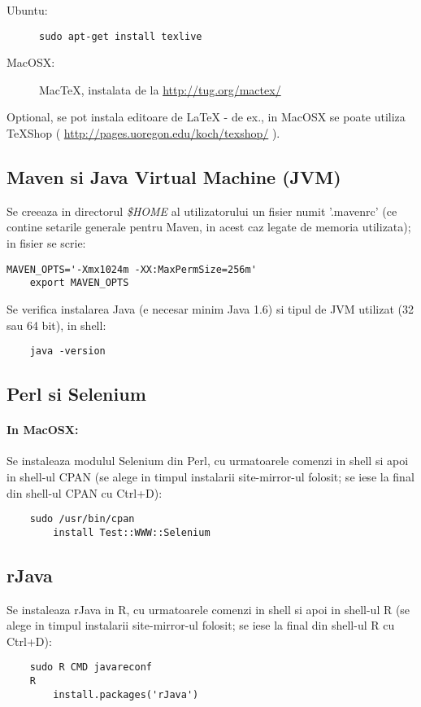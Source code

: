 \begin{description}
\item[Ubuntu:] 
\begin{lstlisting}[breaklines=true]
	sudo apt-get install texlive
\end{lstlisting}
\item[MacOSX:] 
MacTeX, instalata de la \url{http://tug.org/mactex/} 
\end{description}

Optional, se pot instala editoare de LaTeX - de ex., 
in MacOSX  se poate utiliza TeXShop 
( \url{http://pages.uoregon.edu/koch/texshop/} ).

\subsection{Maven si Java Virtual Machine (JVM)}
Se creeaza in directorul \emph{\$HOME} al utilizatorului un fisier numit
'.mavenrc' 
(ce contine setarile generale pentru Maven, in acest caz legate de memoria utilizata);
in fisier se scrie:
\begin{lstlisting}[breaklines=true]
	MAVEN_OPTS='-Xmx1024m -XX:MaxPermSize=256m'
	export MAVEN_OPTS
\end{lstlisting}

\label{java_version}
Se verifica instalarea Java (e necesar minim Java 1.6) si tipul de JVM
utilizat (32 sau 64 bit), in shell:
\begin{lstlisting}
	java -version
\end{lstlisting}

\subsection{Perl si Selenium}
\paragraph{In MacOSX:}
Se instaleaza modulul Selenium din Perl, cu urmatoarele comenzi in shell si apoi in shell-ul CPAN
(se alege in timpul instalarii site-mirror-ul folosit;
se iese la final din shell-ul CPAN cu Ctrl+D):
\begin{lstlisting}
	sudo /usr/bin/cpan
		install Test::WWW::Selenium
\end{lstlisting}

\subsection{rJava}
Se instaleaza rJava in R, cu urmatoarele comenzi in shell si apoi in shell-ul R
(se alege in timpul instalarii site-mirror-ul folosit;
se iese la final din shell-ul R cu Ctrl+D):
\begin{lstlisting}
	sudo R CMD javareconf
	R
		install.packages('rJava')
\end{lstlisting}

